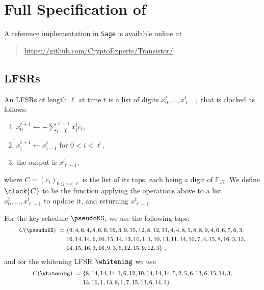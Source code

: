 \section{Full Specification of \coolName{}}
\label{app:spec}


A reference implementation in {\tt Sage} is available online at
\begin{quote}
  \url{https://github.com/CryptoExperts/Transistor/}
\end{quote}


\subsection{LFSRs}
\label{app:spec-lfsrs}

An LFSRs of length $\ell$ at time $t$ is a list of digits ${x^t_0, ..., x^t_{\ell-1}}$
that is clocked as follows:
\begin{enumerate}
\item $x_0^{t+1} \gets - \sum_{i=0}^{\ell-1} x_i^t c_i$,
\item $x_{i}^{t+1} \gets x_{i-1}^t$ for $0 < i < \ell$,
\item the output is $x_{\ell-1}^t$,
\end{enumerate}
where $C=(c_i)_{0 \leq i < \ell}$ is the list of its taps, each being
a digit of $\mathbb{F}_{17}$. We define $\clock{C}$ to be the function
applying the operations above to a list ${x^t_0, ..., x^t_{\ell-1}}$
to update it, and returning $x_{\ell-1}^t$.

For the key schedule $\pseudoKS$, we use the following taps:
\begin{equation*}
  \footnotesize
  \begin{split}
    C(\pseudoKS) ~=~& \{9, 4, 6, 4, 8, 6, 6, 16, 3,
                      9, 15, 12, 8, 12, 11, 4, 4, 8, 1,
                      8, 8, 9, 4, 6, 6, 7, 6, 3, \\
                    & 16, 14, 14, 6, 10, 15, 14, 13, 10, 1, 1,
                      10, 13, 11, 14, 10, 7, 4, 15, 8, 16,
                      3, 13, \\
                    & 14, 15, 16, 3, 16, 9, 3, 6,
                      12, 15, 9, 12, 3\}~,
  \end{split}
\end{equation*}
and for the whitening LFSR $\whitening$ we use
\begin{equation*}
  \footnotesize
  \begin{split}
    C(\whitening) ~=~& \{8, 14, 14, 14, 1, 6, 12, 10, 14, 14,
                       14, 5, 2, 5, 6, 13, 6, 15, 14, 3, \\
                     & 13, 16, 1, 13, 9, 1, 7, 15, 13, 6,
                       14, 3\}
  \end{split}
\end{equation*}


